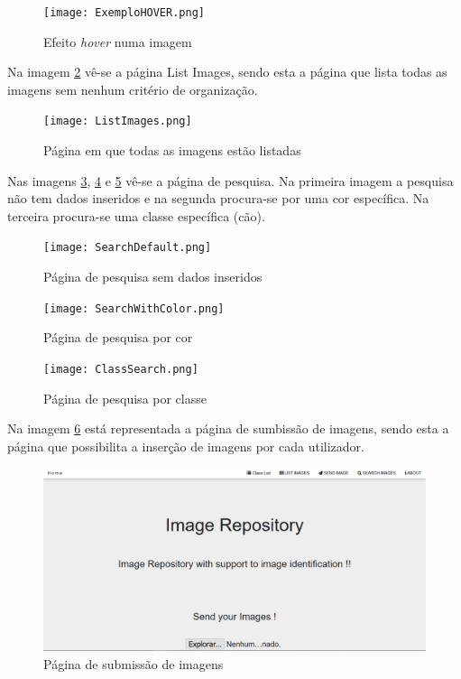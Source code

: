 \documentclass{report}
\begin{document}
\begin{figure}[H]
\texttt{[image: ExemploHOVER.png]}
\caption{Efeito \textit{hover} numa imagem}
\label{Fig4}
\end{figure}

 Na imagem \ref{Fig5} vê-se a página List Images, sendo esta a página que lista todas as imagens sem nenhum critério de organização.

\begin{figure}[H]
\texttt{[image: ListImages.png]}
\caption{Página em que todas as imagens estão listadas}
\label{Fig5}
\end{figure}

Nas imagens \ref{Fig6}, \ref{Fig7} e \ref{Fig8} vê-se a página de pesquisa. Na primeira imagem a pesquisa não tem dados inseridos e na segunda procura-se por uma cor específica. Na terceira procura-se uma classe específica (cão).

\begin{figure}[H]
\texttt{[image: SearchDefault.png]}
\caption{Página de pesquisa sem dados inseridos}
\label{Fig6}
\end{figure}

\begin{figure}[H]
\texttt{[image: SearchWithColor.png]}
\caption{Página de pesquisa por cor}
\label{Fig7}
\end{figure}

\begin{figure}[H]
\texttt{[image: ClassSearch.png]}
\caption{Página de pesquisa por classe}
\label{Fig8}
\end{figure}

Na imagem \ref{Fig9} está representada a página de sumbissão de imagens, sendo esta a página que possibilita a inserção de imagens por cada utilizador.

\begin{figure}[H]
\includegraphics[width=\textwidth]{Send.png}
\caption{Página de submissão de imagens}
\label{Fig9}
\end{figure}
\end{document}

